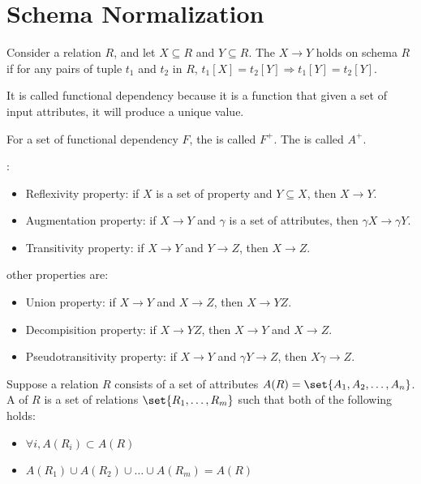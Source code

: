 \section{Schema Normalization}



\begin{definition}
    Consider a relation $R$, and let $X \subseteq R$ and $Y \subseteq R$. The  $X \rightarrow Y$ holds on schema $R$ if for any pairs of tuple $t_1$ and $t_2$ in $R$, $t_1 [X] = t_2 [Y] \Rightarrow t_1 [Y] = t_2[Y]$.
    
    It is called functional dependency because it is a function that given a set of input attributes, it will produce a unique value.
\end{definition}

For a set of functional dependency $F$, the  is called $F^{+}$. The  is called $A^{+}$.



\begin{theorem}
    :
    \begin{itemize}
        \item Reflexivity property: if $X$ is a set of property and $Y \subseteq X$, then $X \rightarrow Y$.
        \item Augmentation property: if $X \rightarrow Y$ and $\gamma$ is a set of attributes, then $\gamma X \rightarrow \gamma Y$.
        \item Transitivity property: if $X \rightarrow Y$ and $Y \rightarrow Z$, then $X \rightarrow Z$.
    \end{itemize}
    
    other properties are:
    \begin{itemize}
        \item Union property: if $X \rightarrow Y$ and $X \rightarrow Z$, then $X \rightarrow YZ$.
        \item Decompisition property: if $X \rightarrow YZ$, then $X \rightarrow Y$ and $X \rightarrow Z$.
        \item Pseudotransitivity property: if $X \rightarrow Y$ and $\gamma Y \rightarrow Z$, then $X \gamma \rightarrow Z$.
    \end{itemize}
\end{theorem}

\begin{definition}[Decompoisition]
    Suppose a relation $R$ consists of a set of attributes $A(R) = \set{A_1, A_2, \dots, A_n}$. A  of $R$ is a set of relations $\set{R_1, \dots, R_m}$ such that both of the following holds:
    \begin{itemize}
        \item $\forall i, A(R_i) \subset A(R)$
        \item $A(R_1) \cup A(R_2) \cup \dots \cup A(R_m) = A(R)$
    \end{itemize}
\end{definition}

